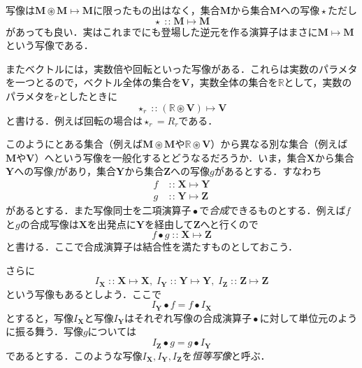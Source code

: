 \documentclass[twocolumn]{jsbook}
\newcommand{\keyword}[1]{{\emph{#1}}}
\DeclareMathOperator{\mathAnyUnaryOperator}{\star}
\DeclareMathOperator{\mathCompose}{\bullet}
\DeclareMathOperator{\mathIn}{:\!:}
\DeclareMathOperator{\mathMapsTo}{\mapsto}
\DeclareMathOperator{\mathSetTimes}{\circledast}
\newcommand{\mathSet}[1]{\mathbf{#1}} %
\newcommand{\mathSpecialSet}[1]{\mathbb{#1}} %
\newcommand{\mathMorph}[2]{#1\mathMapsTo#2}
\begin{document}
写像は$\mathMorph{\mathSet{M}\mathSetTimes\mathSet{M}}{\mathSet{M}}$に限ったもの出はなく，集合$\mathSet{M}$から集合$\mathSet{M}$への写像$\mathAnyUnaryOperator$ただし
\begin{equation}
\mathAnyUnaryOperator\mathIn\mathMorph{\mathSet{M}}{\mathSet{M}}
\end{equation}
があっても良い．実はこれまでにも登場した逆元を作る演算子はまさに$\mathMorph{\mathSet{M}}{\mathSet{M}}$という写像である．

またベクトルには，実数倍や回転といった写像がある．これらは実数のパラメタを一つとるので，ベクトル全体の集合を$\mathSet{V}$，実数全体の集合を$\mathSpecialSet{R}$として，実数のパラメタを$r$としたときに
\begin{equation}
\mathAnyUnaryOperator_r\mathIn{}\mathMorph{(\mathSpecialSet{R}\mathSetTimes\mathSet{V})}{\mathSet{V}}
\end{equation}
と書ける．例えば回転の場合は$\mathAnyUnaryOperator_r=R_r$である．

このようにとある集合（例えば$\mathSet{M}\mathSetTimes\mathSet{M}$や$\mathSpecialSet{R}\mathSetTimes\mathSet{V}$）から異なる別な集合（例えば$\mathSet{M}$や$\mathSet{V}$）へという写像を一般化するとどうなるだろうか．いま，集合$\mathSet{X}$から集合$\mathSet{Y}$への写像$f$があり，集合$\mathSet{Y}$から集合$\mathSet{Z}$への写像$g$があるとする．すなわち
\begin{align}
f&\mathIn\mathMorph{\mathSet{X}}{\mathSet{Y}}\\
g&\mathIn\mathMorph{\mathSet{Y}}{\mathSet{Z}}
\end{align}
があるとする．また写像同士を二項演算子$\mathCompose$で\keyword{合成}できるものとする．例えば$f$と$g$の合成写像は$\mathSet{X}$を出発点に$\mathSet{Y}$を経由して$\mathSet{Z}$へと行くので
\begin{equation}
f\mathCompose g\mathIn\mathMorph{\mathSet{X}}{\mathSet{Z}}
\end{equation}
と書ける．ここで合成演算子は結合性を満たすものとしておこう．

さらに
\begin{equation}
I_\mathSet{X}\mathIn\mathMorph{\mathSet{X}}{\mathSet{X}},\;I_\mathSet{Y}\mathIn\mathMorph{\mathSet{Y}}{\mathSet{Y}},\;I_\mathSet{Z}\mathIn\mathMorph{\mathSet{Z}}{\mathSet{Z}}
\end{equation}
という写像もあるとしよう．ここで
\begin{equation}
I_\mathSet{Y}\mathCompose f=f\mathCompose I_\mathSet{X}
\end{equation}
とすると，写像$I_\mathSet{X}$と写像$I_\mathSet{Y}$はそれぞれ写像の合成演算子$\mathCompose$に対して単位元のように振る舞う．写像$g$については
\begin{equation}
I_\mathSet{Z}\mathCompose g=g\mathCompose I_\mathSet{Y}
\end{equation}
であるとする．このような写像$I_\mathSet{X},I_\mathSet{Y},I_\mathSet{Z}$を\keyword{恒等写像}と呼ぶ．
\end{document}
